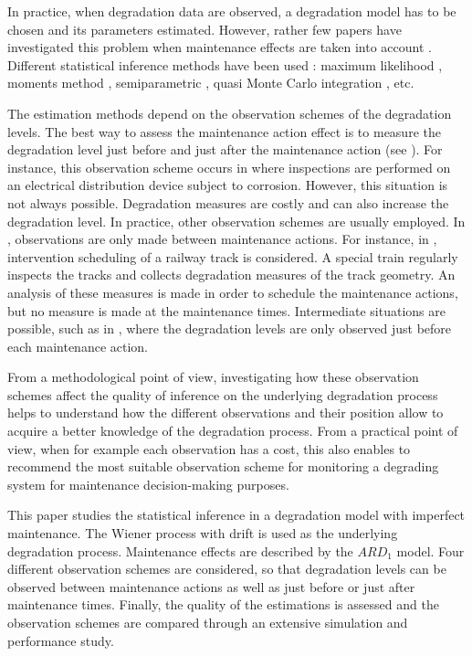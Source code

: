 In practice, when degradation data are observed, a degradation model has to be chosen and its parameters estimated. However, rather few papers have investigated this problem when maintenance effects are taken into account \cite{zhang_degradation-based_2015, giorgio_new_2018, salles_semiparametric_2020,kamranfar_inference_2021}. Different statistical inference methods have been used : maximum likelihood  \cite{kahle_wiener_2010, kamranfar_inference_2021}, moments method \cite{salles_modelling_2020}, semiparametric \cite{salles_modelling_2020}, quasi Monte Carlo integration \cite{zhang_degradation-based_2015}, etc. 

The estimation methods depend on the observation schemes of the degradation levels.
The best way to assess the maintenance action effect is to measure the degradation level just before and just after the maintenance action (see \cite{zhao_optimal_2019,zhao_accelerated_2021}). For instance, this observation scheme occurs in \cite{zhao_accelerated_2021} where inspections are performed on an electrical distribution device subject to corrosion. However, this situation is not always possible. Degradation measures are costly and can also increase the degradation level. In practice, other observation schemes are usually employed. In \cite{mercier_bivariate_2012,zhang_degradation-based_2015, giorgio_new_2018}, observations are only made between maintenance actions. For instance, in \cite{mercier_bivariate_2012}, intervention scheduling of a railway track is considered. A special train regularly inspects the tracks and collects degradation measures of the track geometry. An analysis of these measures is made in order to schedule the maintenance actions, but no measure is made at the maintenance times. Intermediate situations are possible, such as in \cite{salles_semiparametric_2020, kamranfar_inference_2021}, where the degradation levels are only observed just before each maintenance action.

From a methodological point of view, investigating how these observation schemes affect the quality of inference on the underlying degradation process helps to understand how the different observations and their position allow to acquire a better knowledge of the degradation process. From a practical point of view, when for example each observation has a cost, this also enables to recommend the most suitable observation scheme for monitoring a degrading system for maintenance decision-making purposes.

This paper studies the statistical inference in a degradation model with imperfect maintenance. The Wiener process with drift is used as the underlying degradation process. Maintenance effects are described by the $ARD_1$ model. Four different observation schemes are considered, so that degradation levels can be observed between maintenance actions as well as just before or just after maintenance times. Finally, the quality of the estimations is assessed and the observation schemes are compared through an extensive simulation and performance study. 

